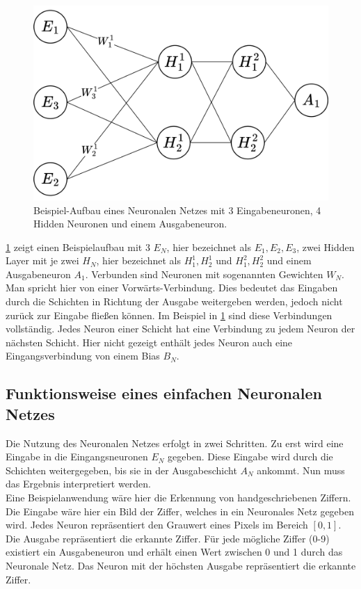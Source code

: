 \begin{figure}
    \centering
    \includegraphics[width=\textwidth]{zeichnungen/nn.png}
    \caption{Beispiel-Aufbau eines Neuronalen Netzes mit 3 Eingabeneuronen, 4 Hidden Neuronen und einem Ausgabeneuron.}\label{nn_simple}
\end{figure}

\cref{nn_simple} zeigt einen Beispielaufbau mit 3 $E_N$, hier bezeichnet als $E_1,E_2,E_3$, zwei Hidden Layer mit je zwei $H_N$, hier bezeichnet als $H^1_1, H^1_2$ und $H^2_1, H^2_2$ und einem Ausgabeneuron $A_1$.
Verbunden sind Neuronen mit sogenannten Gewichten $W_N$. Man spricht hier von einer Vorwärts-Verbindung.
Dies bedeutet das Eingaben durch die Schichten in Richtung der Ausgabe weitergeben werden, jedoch nicht zurück zur Eingabe fließen können.
Im Beispiel in \cref{nn_simple} sind diese Verbindungen vollständig.
Jedes Neuron einer Schicht hat eine Verbindung zu jedem Neuron der nächsten Schicht.
Hier nicht gezeigt enthält jedes Neuron auch eine Eingangsverbindung von einem Bias $B_N$.

\subsection{Funktionsweise eines einfachen Neuronalen Netzes}
Die Nutzung des Neuronalen Netzes erfolgt in zwei Schritten.
Zu erst wird eine Eingabe in die Eingangsneuronen $E_N$ gegeben.
Diese Eingabe wird durch die Schichten weitergegeben, bis sie in der Ausgabeschicht $A_N$ ankommt.
Nun muss das Ergebnis interpretiert werden.\\

Eine Beispielanwendung wäre hier die Erkennung von handgeschriebenen Ziffern.
Die Eingabe wäre hier ein Bild der Ziffer, welches in ein Neuronales Netz gegeben wird.
Jedes Neuron repräsentiert den Grauwert eines Pixels im Bereich $[0,1]$.
Die Ausgabe repräsentiert die erkannte Ziffer.
Für jede mögliche Ziffer (0-9) existiert ein Ausgabeneuron und erhält einen Wert zwischen 0 und 1 durch das Neuronale Netz.
Das Neuron mit der höchsten Ausgabe repräsentiert die erkannte Ziffer.\\

